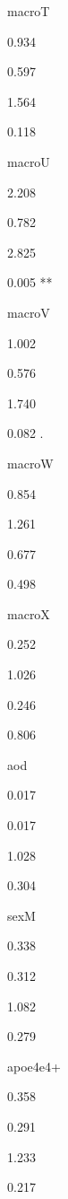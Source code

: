 \documentclass[]{book}
\begin{document}
macroT

0.934

0.597

1.564

0.118

macroU

2.208

0.782

2.825

0.005 **

macroV

1.002

0.576

1.740

0.082 .

macroW

0.854

1.261

0.677

0.498

macroX

0.252

1.026

0.246

0.806

aod

0.017

0.017

1.028

0.304

sexM

0.338

0.312

1.082

0.279

apoe4e4+

0.358

0.291

1.233

0.217
\end{document}
